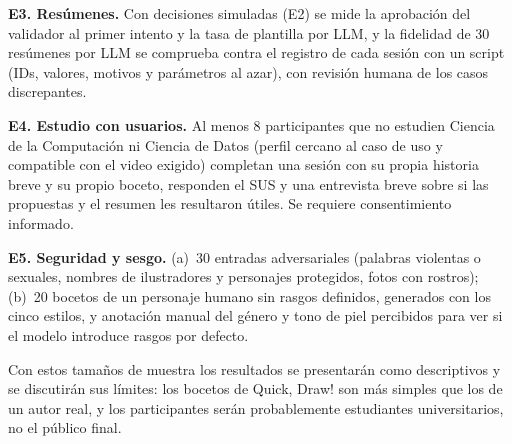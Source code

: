 \documentclass[10pt,a4paper,twocolumn]{article}
\begin{document}
\textbf{E3. Resúmenes.} Con decisiones simuladas (E2) se mide la aprobación del validador al primer intento y la tasa de plantilla por LLM, y la fidelidad de 30 resúmenes por LLM se comprueba contra el registro de cada sesión con un script (IDs, valores, motivos y parámetros al azar), con revisión humana de los casos discrepantes.

\textbf{E4. Estudio con usuarios.} Al menos 8 participantes que no estudien Ciencia de la Computación ni Ciencia de Datos (perfil cercano al caso de uso y compatible con el video exigido) completan una sesión con su propia historia breve y su propio boceto, responden el SUS y una entrevista breve sobre si las propuestas y el resumen les resultaron útiles. Se requiere consentimiento informado.

\textbf{E5. Seguridad y sesgo.} (a)~30 entradas adversariales (palabras violentas o sexuales, nombres de ilustradores y personajes protegidos, fotos con rostros); (b)~20 bocetos de un personaje humano sin rasgos definidos, generados con los cinco estilos, y anotación manual del género y tono de piel percibidos para ver si el modelo introduce rasgos por defecto.

Con estos tamaños de muestra los resultados se presentarán como descriptivos y se discutirán sus límites: los bocetos de Quick, Draw! son más simples que los de un autor real, y los participantes serán probablemente estudiantes universitarios, no el público final.

\end{document}
